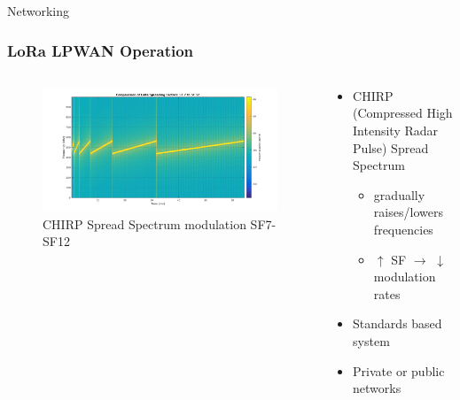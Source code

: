 \documentclass{beamer}
\begin{document}
  \begin{frame}{Networking}
    \frametitle{LoRa LPWAN Operation}
    \begin{columns}
      \begin{column}{0.5\textwidth}
        \begin{figure}[htbp]
          \centering
          \includegraphics[width=\textwidth]{Chirp.png}
          \caption{CHIRP Spread Spectrum modulation SF7-SF12 \cite{ghoslya2017lora}}
          \label{fig:CHIRP_Spread_Spectrum}
        \end{figure}
      \end{column}
      \begin{column}{0.5\textwidth}
        \begin{itemize}
          \item CHIRP (Compressed High Intensity Radar Pulse) Spread Spectrum
          \begin{itemize}
            \item gradually raises/lowers frequencies
            \item $\uparrow$ SF $\rightarrow$ $\downarrow$ modulation rates
          \end{itemize}
          \item Standards based system
          \item Private or public networks
        \end{itemize}
      \end{column}
    \end{columns}
  \end{frame}
\end{document}
